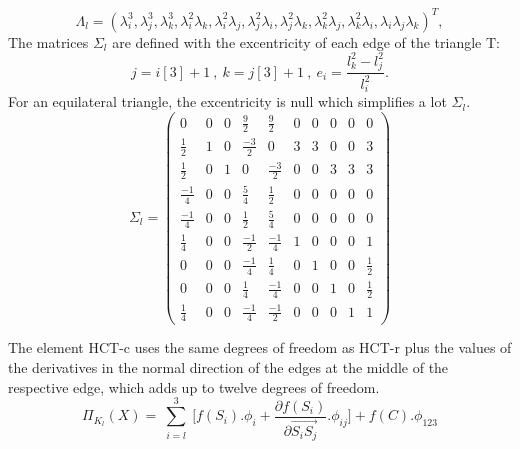 \documentclass[proc]{edpsmath}
\begin{document}
\begin{equation*}
  \Lambda_l = ( \lambda_i^3,\lambda_j^3,\lambda_k^3,\lambda_i^2\lambda_k,\lambda_i^2\lambda_j,\lambda_j^2\lambda_i,\lambda_j^2\lambda_k,\lambda_k^2\lambda_j,\lambda_k^2\lambda_i,\lambda_i\lambda_j\lambda_k)^T,
\end{equation*} 
  \noindent The matrices $\Sigma_l$ are defined with the excentricity of each edge of the triangle T: 
\begin{equation*}
j=i[3]+1 ~,~ k=j[3]+1~,~ e_i = \frac{l_k^2 - l_j^2}{l_i^2}.
\end{equation*} 
For an equilateral triangle, the excentricity is null which simplifies a lot $\Sigma_l$.
\begin{equation*}
\Sigma_l = 
\begin{pmatrix}
	0 & 0 & 0 & \frac{9}{2} & \frac{9}{2} & 0 & 0 & 0 & 0 & 0  \\
	\frac{1}{2} & 1 & 0 & \frac{-3}{2} & 0 & 3 & 3 & 0 & 0 & 3 \\
	\frac{1}{2} & 0 & 1 & 0 & \frac{-3}{2} & 0 & 0 & 3 & 3 & 3 \\	 
	\frac{-1}{4} & 0 & 0 & \frac{ 5}{4} & \frac{ 1}{2} & 0 & 0 & 0 & 0 & 0 \\	 
	\frac{-1}{4} & 0 & 0 & \frac{ 1}{2} & \frac{ 5}{4} & 0 & 0 & 0 & 0 & 0 \\
	\frac{ 1}{4} & 0 & 0 & \frac{-1}{2} & \frac{-1}{4} & 1 & 0 & 0 & 0 & 1 \\
	0 & 0 & 0 & \frac{-1}{4} & \frac{ 1}{4} & 0 & 1 & 0 & 0 & \frac{1}{2} \\
	0 & 0 & 0 & \frac{ 1}{4} & \frac{-1}{4} & 0 & 0 & 1 & 0 & \frac{1}{2} \\
	\frac{1}{4} & 0 & 0 & \frac{-1}{4} & \frac{-1}{2} & 0 & 0 & 0 & 1 & 1 
\end{pmatrix}
\end{equation*} 

   
 
The element HCT-c uses the same degrees of freedom as HCT-r plus the values of the derivatives in the normal direction of the edges at the middle of the respective edge, which adds up to twelve degrees of freedom.
\begin{equation*}
\Pi_{K_l} (X) = \sum \limits_{\substack{i=l }}^{3}{ [f(S_i).\phi_i +  \frac{\partial f(S_i)}{\partial  \overrightarrow{ S_i S_j } }.\phi_{ij} } ]  + f(C).\phi_{123}
\end{equation*} 
\end{document}
